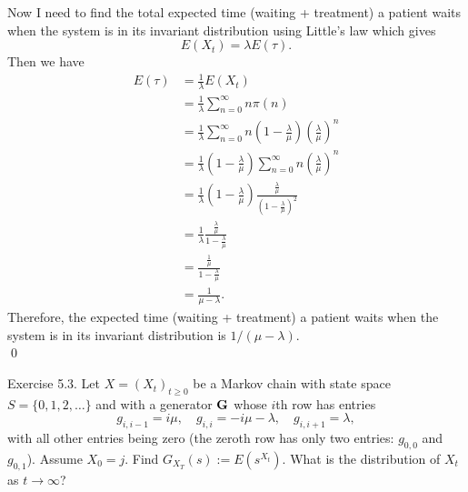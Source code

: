 \documentclass[10pt]{amsart}
\begin{document}
\noindent
Now I need to find the total expected time (waiting + treatment) a patient waits when the system is in its invariant distribution using Little's law which gives
$$
E \left( X_t \right) = \lambda E \left( \tau \right).
$$
Then we have
\begin{align*}
E \left( \tau \right) &= \frac 1 \lambda E \left( X_t \right) \\
	&= \frac 1 \lambda \sum_{n = 0}^\infty n \pi(n) \\
	&= \frac 1 \lambda \sum_{n = 0}^\infty n \left( 1 - \frac \lambda \mu \right) \left( \frac \lambda \mu \right)^n \\
	&= \frac 1 \lambda \left( 1 - \frac \lambda \mu \right) \sum_{n = 0}^\infty n \left( \frac \lambda \mu \right)^n \\
	&= \frac 1 \lambda \left( 1 - \frac \lambda \mu \right) \frac {\frac \lambda \mu}{\left( 1 - \frac \lambda \mu \right)^2} \\
	&= \frac 1 \lambda \frac {\frac \lambda \mu}{1 - \frac \lambda \mu} \\
	&= \frac {\frac 1 \mu}{1 - \frac \lambda \mu} \\
	&= \frac 1 {\mu - \lambda}.
\end{align*}
Therefore, the expected time (waiting + treatment) a patient waits when the system is in its invariant distribution is $1/(\mu - \lambda)$. \\
\qed \\

\newpage


 Exercise 5.3.
Let $X = (X_t)_{t \geq 0}$ be a Markov chain with state space $S = \{0, 1, 2, \dots\}$ and with a generator ${ \bf G} $ whose $i$th row has entries
$$
g_{i, i-1} = i\mu, \quad g_{i, i} = -i \mu - \lambda, \quad g_{i, i+1} = \lambda,
$$
with all other entries being zero (the zeroth row has only two entries: $g_{0,0}$ and $g_{0,1}$).
Assume $X_0 = j$.
Find $G_{X_T}(s) := E(s^{X_t})$.
What is the distribution of $X_t$ as $t \rightarrow \infty$? \\
\end{document}
